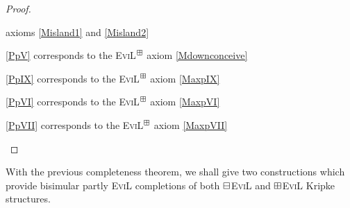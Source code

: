 \begin{proof}
\begin{minipage}[b]{0.5\linewidth}
\begin{empt}
     axioms \eqref{Misland1} and \eqref{Misland2}
    \item \ref{PpV} corresponds to the \textsc{EviL}$^\boxplus$
     axiom \eqref{Mdownconceive}
    \item \ref{PpIX} corresponds to the \textsc{EviL}$^\boxplus$
     axiom \eqref{MaxpIX}
     \item \ref{PpVI} corresponds to the \textsc{EviL}$^\boxplus$
     axiom \eqref{MaxpVI}
     \item \ref{PpVII} corresponds to the \textsc{EviL}$^\boxplus$
     axiom \eqref{MaxpVII}
  \end{empt}
\end{minipage}
\end{proof}

With the previous completeness theorem, we shall give two constructions which
provide bisimular partly \textsc{EviL} completions of 
both $\boxminus$\textsc{EviL} and $\boxplus$\textsc{EviL} Kripke
structures.

